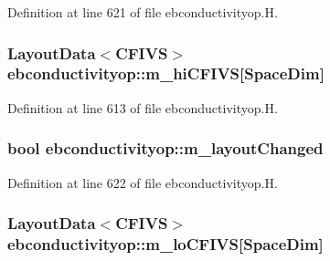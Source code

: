 Definition at line 621 of file ebconductivityop.\+H.

\subsubsection[{\texorpdfstring{m\+\_\+hi\+C\+F\+I\+VS}{m_hiCFIVS}}]{\setlength{\rightskip}{0pt plus 5cm}Layout\+Data$<$C\+F\+I\+VS$>$ ebconductivityop\+::m\+\_\+hi\+C\+F\+I\+VS\mbox{[}Space\+Dim\mbox{]}\hspace{0.3cm}{\ttfamily [protected]}}\hypertarget{classebconductivityop_a2231a77b78b316f70d25a80729b9de91}{}\label{classebconductivityop_a2231a77b78b316f70d25a80729b9de91}


Definition at line 613 of file ebconductivityop.\+H.

\subsubsection[{\texorpdfstring{m\+\_\+layout\+Changed}{m_layoutChanged}}]{\setlength{\rightskip}{0pt plus 5cm}bool ebconductivityop\+::m\+\_\+layout\+Changed\hspace{0.3cm}{\ttfamily [protected]}}\hypertarget{classebconductivityop_acd4bd42bd2eb827a11a6f548fad5e6fd}{}\label{classebconductivityop_acd4bd42bd2eb827a11a6f548fad5e6fd}


Definition at line 622 of file ebconductivityop.\+H.

\subsubsection[{\texorpdfstring{m\+\_\+lo\+C\+F\+I\+VS}{m_loCFIVS}}]{\setlength{\rightskip}{0pt plus 5cm}Layout\+Data$<$C\+F\+I\+VS$>$ ebconductivityop\+::m\+\_\+lo\+C\+F\+I\+VS\mbox{[}Space\+Dim\mbox{]}\hspace{0.3cm}{\ttfamily [protected]}}\hypertarget{classebconductivityop_af20f1aa4c42e4f9e7463d6ba26895bae}{}\label{classebconductivityop_af20f1aa4c42e4f9e7463d6ba26895bae}


